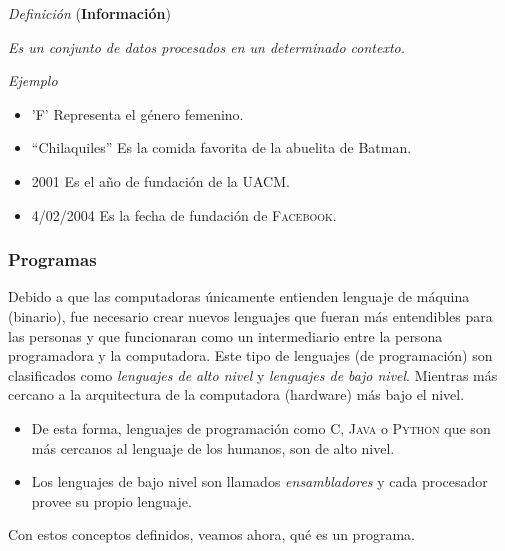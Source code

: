 \documentclass[11pt,spanish]{article}
\begin{document}
\begin{bclogo}[noborder=true, couleurBarre=celestialblue,arrondi =0.1, couleur =anti-flashwhite, logo=\bcplume, marge =10]{\textit{Definición} (\textbf{Información})}
\vspace{0.25cm}

\emph{Es un conjunto de datos procesados en un determinado contexto.}

\vspace{0.25cm}       
\end{bclogo}

\begin{bclogo}[noborder=true, couleurBarre=celestialblue,arrondi =0.1, couleur =anti-flashwhite, logo=\bccrayon, marge =10]{\textit{Ejemplo}}
\vspace{0.25cm}
\begin{itemize}
\item 'F' Representa el género femenino. 
\item ``Chilaquiles'' Es la comida favorita de la abuelita de Batman. 
\item 2001 Es el año de fundación de la UACM. 
\item 4/02/2004 Es la fecha de fundación de \textsc{Facebook}.
\end{itemize}
\vspace{0.25cm}       
\end{bclogo}

\subsubsection*{Programas}

Debido a que las computadoras únicamente entienden lenguaje de máquina
(binario), fue necesario crear nuevos lenguajes que fueran más entendibles
para las personas y que funcionaran como un intermediario entre la
persona programadora y la computadora. Este tipo de lenguajes (de programación)
son clasificados como \emph{lenguajes de alto nivel }y \emph{lenguajes
de bajo nivel}. Mientras más cercano a la arquitectura de la computadora
(hardware) más bajo el nivel.
\begin{itemize}
\item De esta forma, lenguajes de programación como \textsc{C}, \textsc{Java}
o \textsc{Python} que son más cercanos al lenguaje de los humanos,
son de alto nivel.
\item Los lenguajes de bajo nivel son llamados \emph{ensambladores} y cada
procesador provee su propio lenguaje.
\end{itemize}
Con estos conceptos definidos, veamos ahora, qué es un programa.
\end{document}
